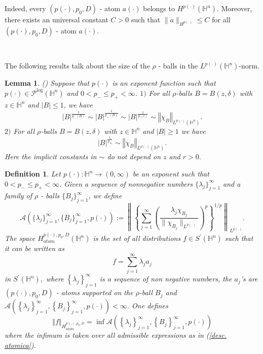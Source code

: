 \documentclass[oneside,10pt]{article}
\newtheorem{definition}[theorem]{Definition}
\newtheorem{lemma}[theorem]{Lemma}
\begin{document}
Indeed, every $(p(\cdot), p_{0}, D)$ - atom $a(\cdot)$ belongs to $H^{p(\cdot)}(\mathbb{H}^{n})$. Moreover, there exists an universal constant
$C > 0$ such that $\| a \|_{H^{p(\cdot)}} \leq C$ for all $(p(\cdot), p_{0}, D)$ - atom $a(\cdot)$.

\

The following results talk about the size of the $\rho$ - balls in the $L^{p(\cdot)}(\mathbb{H}^{n})$-norm.

\begin{lemma} \label{Lp size}
(\cite[Lemma 4.1.]{Fang}) Suppose that $p(\cdot)$ is an exponent function such that $p(\cdot) \in \mathcal{P}^{\log}(\mathbb{H}^n)$ and 
$0 < p_{-} \leq p_{+} < \infty$.
\newline
$1)$ For all $\rho$-balls $B=B(z, \delta)$ with $z\in \mathbb{H}^{n}$ and $\vert B \vert \leq 1$, we
have
\[
\left\vert B\right\vert ^{\frac{1}{p_{-}(B)}}\sim \left\vert  B \right\vert^{
\frac{1}{p_{+}(B)}}\sim \left\vert B\right\vert ^{\frac{1}{p(z)}}\sim
\left\Vert \chi _{B}\right\Vert _{L^{p(\cdot)}(\mathbb{H}^{n})}.
\]%
$2)$ For all $\rho$-balls $B=B(z, \delta)$ with $z\in \mathbb{H}^{n}$ and $\vert B \vert \geq 1$ we
have
\[
\left\vert B \right\vert ^{\frac{1}{p_{\infty }}}\sim \left\Vert \chi
_{B}\right\Vert _{L^{p(\cdot)}(\mathbb{H}^{n})}.
\]
Here the implicit constants in $\sim $ do not depend on $z$ and $r>0.$
\end{lemma}


\begin{definition} Let $p(\cdot):\mathbb{H}^{n} \to ( 0,\infty)$ be an exponent such that $0 < p_{-} \leq p_{+} < \infty$.
Given a sequence of nonnegative numbers $\{ \lambda_j \}_{j=1}^{\infty}$ and a family of $\rho$ - balls $\{ B_j \}_{j=1}^{\infty}$, we define
\begin{equation} \label{cantidad A}
\mathcal{A} \left( \{ \lambda_j \}_{j=1}^{\infty}, \{ B_j \}_{j=1}^{\infty}, p(\cdot) \right) := 
\left\| \left\{ \sum_{j=1}^{\infty} \left( \frac{\lambda_j  \chi_{B_j}}{\| \chi_{B_j} \|_{L^{p(\cdot)}}} \right)^{\underline{p}} 
\right\}^{1/\underline{p}} \right\|_{L^{p(\cdot)}}.
\end{equation}
The space $H_{atom}^{p(\cdot),p_{0},D}\left( \mathbb{H}^{n}\right) $ is the set of all distributions $f\in S^{\prime }(\mathbb{H}^{n})$ such that it can be written as 
\begin{equation}
f=\sum\limits_{j=1}^{\infty }\lambda_{j}a_{j}  \label{desc. atomica}
\end{equation}%
in $S^{\prime }(\mathbb{H}^{n}),$ where $\left\{ \lambda_{j}\right\}_{j=1}^{\infty }$ is a sequence of non negative numbers, the $a_{j}$'s are $(p(\cdot),p_{0},D)$ - atoms supported on the $\rho$-ball $B_j$ and 
$\mathcal{A}\left( \left\{ \lambda_{j}\right\}_{j=1}^{\infty },\left\{ B_{j}\right\} _{j=1}^{\infty }, p(\cdot)\right) < \infty$. One defines
\[
\left\Vert f\right\Vert _{H_{atom}^{p(\cdot),p_{0},D}}=\inf \mathcal{A}\left(\left\{ \lambda_{j}\right\} _{j=1}^{\infty }, 
\left\{ B_{j}\right\} _{j=1}^{\infty}, p(\cdot)\right)
\]%
where the infimum is taken over all admissible expressions as in (\ref{desc. atomica}).
\end{definition}
\end{document}
